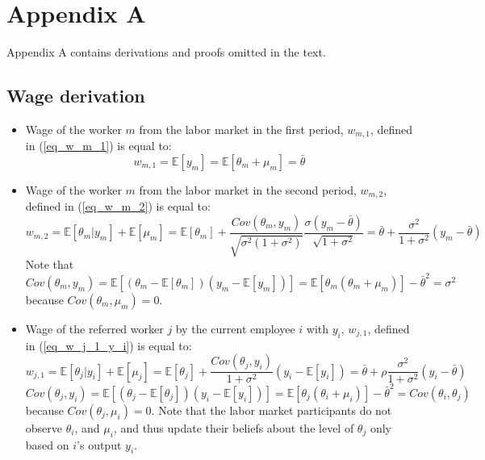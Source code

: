 \documentclass[12pt]{article}
\begin{document}




\clearpage

\section*{Appendix A} \label{sec:appendixa}
Appendix A contains derivations and proofs omitted in the text.
\subsection*{Wage derivation}
\begin{itemize}
    \item Wage of the worker $m$ from the labor market in the first period, $w_{m,1}$, defined in (\ref{eq_w_m_1}) is equal to:
    \begin{equation*}
    w_{m,1} = \mathbb{E}[y_{m}] = \mathbb{E}[\theta_m + \mu_m] = \bar{\theta}
    \end{equation*}
    
    \item Wage of the worker $m$ from the labor market in the second period, $w_{m,2}$, defined in (\ref{eq_w_m_2}) is equal to:
    \begin{equation*}
    w_{m,2} = \mathbb{E}[\theta_{m}|y_{m}] + \mathbb{E}[\mu_m] = \mathbb{E}[\theta_{m}] + \frac{Cov(\theta_m, y_m)}{\sqrt{\sigma^2(1+\sigma^2)}}\frac{\sigma(y_m - \bar{\theta})}{\sqrt{1+\sigma^2}} = \bar{\theta} + \frac{\sigma^2}{1+\sigma^2}(y_m - \bar{\theta})
    \end{equation*}
    Note that $Cov(\theta_m, y_m) = \mathbb{E}[(\theta_m - \mathbb{E}[\theta_m])(y_m - \mathbb{E}[y_m])] = \mathbb{E}[\theta_m(\theta_m + \mu_m)]-\bar{\theta}^2 = \sigma^2$ because $Cov(\theta_m,\mu_m) = 0$.
    
    \item Wage of the referred worker $j$ by the current employee $i$ with $y_i$, $w_{j,1}$, defined in (\ref{eq_w_j_1_y_i}) is equal to:
    \begin{equation}\label{eq_w_j_1}
    w_{j,1} = \mathbb{E}[\theta_{j}|y_{i}] + \mathbb{E}[\mu_j] = \mathbb{E}[\theta_j]+ \frac{Cov(\theta_j,y_i)}{1+\sigma^2}\left(y_i - \mathbb{E}[y_i]\right) = \bar{\theta}+\rho\frac{\sigma^2}{1+\sigma^2}(y_i-\bar{\theta})
    \end{equation}
    $Cov(\theta_j, y_i) = \mathbb{E}[(\theta_j - \mathbb{E}[\theta_j])(y_i - \mathbb{E}[y_i])] = \mathbb{E}[\theta_j(\theta_i + \mu_i)]-\bar{\theta}^2 = Cov(\theta_i,\theta_j)$ because $Cov(\theta_j,\mu_i) = 0$.
    Note that the labor market participants do not observe $\theta_i$, and $\mu_i$, and thus update their beliefs about the level of $\theta_j$ only based on $i$'s output $y_i$.
    

\end{itemize}
\end{document}
